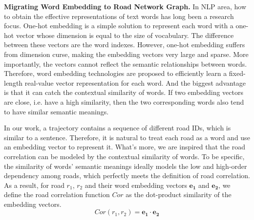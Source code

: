 \vspace{\baselineskip}

\textbf{Migrating Word Embedding to Road Network Graph.} In NLP area, how to obtain the effective representations of text words has long been a research focus. One-hot embedding is a simple solution to represent each word with a one-hot vector whose dimension is equal to the size of vocabulary. The difference between these vectors are the word indexes. However, one-hot embedding suffers from dimension curse, making the embedding vectors very large and sparse. More importantly, the vectors cannot reflect the semantic relationships between words. Therefore, word embedding technologies\cite{word_embed} are proposed to efficiently learn a fixed-length real-value vector representation for each word. And the biggest advantage is that it can catch the contextual similarity of words. If two embedding vectors are close, i.e. have a high similarity, then the two corresponding words also tend to have similar semantic meanings.

In our work, a trajectory contains a sequence of different road IDs, which is similar to a sentence. Therefore, it is natural to treat each road as a word\cite{transfer} and use an embedding vector to represent it. What's more, we are inspired that the road correlation can be modeled by the contextual similarity of words. To be specific, the similarity of words' semantic meanings ideally models the low and high-order dependency among roads, which perfectly meets the definition of road correlation. As a result, for road $r_1$, $r_2$ and their word embedding vectors $\mathbf{e_1}$ and $\mathbf{e_2}$, we define the road correlation function $Cor$ as the dot-product similarity\cite{dot_prod_simi} of the embedding vectors.
\begin{equation}
    Cor(r_1, r_2)=\mathbf{e_1}\cdot \mathbf{e_2}
\end{equation}

\vspace{\baselineskip}

